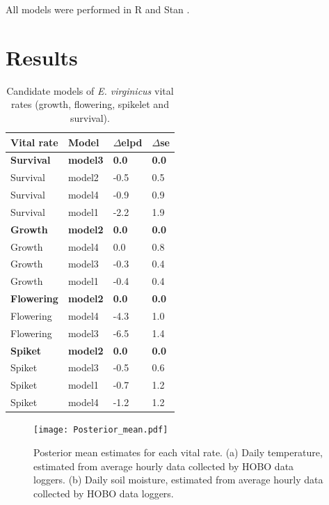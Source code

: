 \documentclass[11pt]{article}
\begin{document}
All models were performed in R \citep{RCoreTeam} and Stan \citep{Rstan}.
\section*{Results}
\begin{table}[H]
\caption{Candidate models of  \emph{E. virginicus} vital rates (growth, flowering, spikelet and survival).}
\label{Table:models}
\bigskip{}
\centering
\begin{tabular}{llll}\hline
			    Vital rate   &      Model   &     $\Delta$elpd  &  $\Delta$se     \\ \hline
			 \textbf{Survival} &    \textbf{model3}   &     \textbf{0.0} &     \textbf{ 0.0}    \\
			Survival &     model2  & -0.5 &   0.5       \\
			Survival &   model4    & -0.9    &   0.9\\
			Survival & model1 & -2.2 & 1.9  \\
		     \textbf{Growth} &   \textbf{model2}&  \textbf{0.0} &  \textbf{0.0} \\
		    Growth & model4 & 0.0 &  0.8 \\
		    Growth & model3 & -0.3 &  0.4\\
		    Growth  &  model1& -0.4 & 0.4\\
		     \textbf{Flowering} &   \textbf{model2}&  \textbf{0.0}  &  \textbf{0.0}  \\
		    Flowering & model4 & -4.3 &  1.0\\
		    Flowering & model3 & -6.5 &  1.4\\
		    		     \textbf{Spiket} &   \textbf{model2}&  \textbf{0.0} &  \textbf{0.0}  \\
		    Spiket & model3 & -0.5 &  0.6\\
		    Spiket & model1 & -0.7&  1.2\\
		    Spiket  &  model4 & -1.2 & 1.2\\\hline			    				 			     			     
\end{tabular}
\end{table}

\begin{figure}[H]
\texttt{[image: Posterior\_mean.pdf]}
\caption{Posterior mean estimates for each vital rate. 
(a) Daily temperature, estimated from average hourly data collected by  HOBO data loggers. 
(b) Daily  soil moisture, estimated  from average hourly data  collected by  HOBO data loggers. 
}
\label{fig:climate}
\end{figure}
\end{document}
